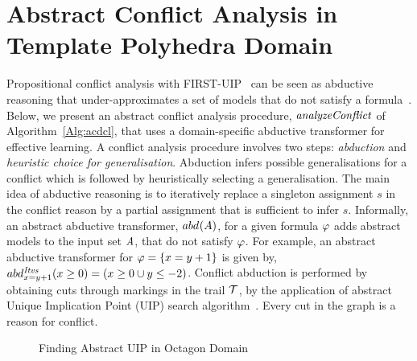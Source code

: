 \section{Abstract Conflict Analysis in Template Polyhedra Domain}\label{sec:conflict}
%
Propositional conflict analysis with FIRST-UIP~\cite{cdcl} can be seen 
as abductive reasoning that under-approximates a 
set of models that do not satisfy a formula~\cite{sas12,dhk2013-popl}.  
Below, we present an abstract conflict analysis procedure, $\mathit{analyzeConflict}$ of 
Algorithm~\ref{Alg:acdcl}, that uses a 
domain-specific abductive transformer for effective learning. 
A conflict analysis procedure involves two steps: {\em abduction} 
and {\em heuristic choice for generalisation}. Abduction infers 
possible generalisations for a conflict which is followed by 
heuristically selecting a generalisation.  The main idea of abductive reasoning is to 
iteratively replace a singleton assignment $s$ in the conflict 
reason by a partial assignment that is sufficient to infer $s$.  
Informally, an abstract abductive transformer, $abd_{}^{}(A)$, 
for a given formula $\varphi$ adds abstract models to the input set
$\mathit{A}$, that do not satisfy $\varphi$. 
%
For example, an abstract abductive transformer for $\varphi=\{x=y+1\}$ 
is given by, $abd_{x=y+1}^{\mathit{Itvs}}(x \geq 0)=(x \geq 0 \cup y \leq -2)$.
%
Conflict abduction is performed by obtaining cuts through markings in the 
trail $\mathcal{T}$, by the application of abstract Unique Implication Point (UIP) 
search algorithm~\cite{cdcl}.  Every cut in the graph is a reason for conflict. 
%
%
\begin{figure}[t]
\centering
{}
\caption{\label{uip} Finding Abstract UIP in Octagon Domain}
\end{figure}  
%
